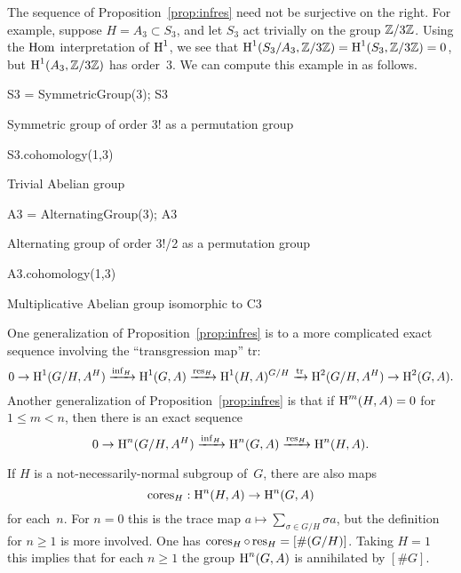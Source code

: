 \begin{example}
	The sequence of Proposition~\ref{prop:infres} need not be
	surjective on the right.  For example, suppose $H=A_3 \subset S_3$,
	and let $S_3$ act trivially on the group $\mathbb{Z}/3\mathbb{Z}$.
	Using the $\operatorname{Hom}$ interpretation of $\operatorname{H}^1$, we see
	that
	$\operatorname{H}^1(S_3/A_3, \mathbb{Z}/3\mathbb{Z}) = \operatorname{H}^1(S_3, \mathbb{Z}/3\mathbb{Z}) = 0$, but
	$\operatorname{H}^1(A_3, \mathbb{Z}/3\mathbb{Z})$ has order~$3$.
	We can compute this example in \sage as follows.
\begin{sagecode}
\begin{sagecell}
S3 = SymmetricGroup(3); S3
\end{sagecell}
\begin{sageout}
Symmetric group of order 3! as a permutation group
\end{sageout}
\begin{sagecell}
S3.cohomology(1,3)
\end{sagecell}
\begin{sageout}
Trivial Abelian group
\end{sageout}
\begin{sagecell}
A3 = AlternatingGroup(3); A3
\end{sagecell}
\begin{sageout}
Alternating group of order 3!/2 as a permutation group
\end{sageout}
\begin{sagecell}
A3.cohomology(1,3)
\end{sagecell}
\begin{sageout}
Multiplicative Abelian group isomorphic to C3
\end{sageout}
\end{sagecode}
\end{example}


\begin{remark}
	One generalization of Proposition~\ref{prop:infres} is to
	a more complicated exact sequence involving the ``transgression map''
	tr:
	$$
		0 \to \operatorname{H}^1(G/H, A^H)\xrightarrow{\operatorname{inf}_H} \operatorname{H}^1(G,A)\xrightarrow{\operatorname{res}_H} \operatorname{H}^1(H,A)^{G/H}
		\xrightarrow{{\rm tr}}  \operatorname{H}^2(G/H,A^H) \to \operatorname{H}^2(G,A).
	$$
	Another generalization of Proposition~\ref{prop:infres}
	is that if $\operatorname{H}^m(H,A) = 0$ for $1\leq m < n$, then
	there is an exact sequence
	$$
		0 \to \operatorname{H}^n(G/H, A^H)\xrightarrow{\operatorname{inf}_H}  \operatorname{H}^n(G,A)\xrightarrow{\operatorname{res}_H} \operatorname{H}^n(H,A).
	$$
\end{remark}


\begin{remark}\label{rmk:cores}
	If $H$ is a not-necessarily-normal subgroup of~$G$, there are also
	maps
	$$
		\operatorname{cores}_H: \operatorname{H}^n(H,A) \to \operatorname{H}^n(G,A)
	$$
	for each~$n$.  For $n=0$ this is the trace map
	$a\mapsto \sum_{\sigma \in G/H} \sigma a$, but the
	definition for $n\geq 1$ is more involved. One has
	$\operatorname{cores}_H \circ \operatorname{res}_H = [\#(G/H)]$. Taking $H=1$ this
	implies that for each $n\geq 1$ the group
	$\operatorname{H}^n(G,A)$ is annihilated by $[\#G]$.
\end{remark}


